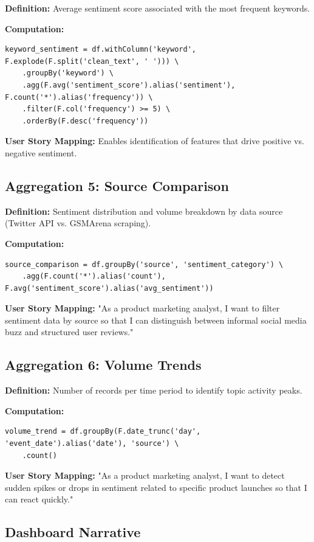 \documentclass[12pt]{article}
\begin{document}
\textbf{Definition:} Average sentiment score associated with the most frequent keywords.

\textbf{Computation:}
\begin{lstlisting}
keyword_sentiment = df.withColumn('keyword', F.explode(F.split('clean_text', ' '))) \
    .groupBy('keyword') \
    .agg(F.avg('sentiment_score').alias('sentiment'), F.count('*').alias('frequency')) \
    .filter(F.col('frequency') >= 5) \
    .orderBy(F.desc('frequency'))
\end{lstlisting}

\textbf{User Story Mapping:} Enables identification of features that drive positive vs. negative sentiment.

\subsection{Aggregation 5: Source Comparison}

\textbf{Definition:} Sentiment distribution and volume breakdown by data source (Twitter API vs. GSMArena scraping).

\textbf{Computation:}
\begin{lstlisting}
source_comparison = df.groupBy('source', 'sentiment_category') \
    .agg(F.count('*').alias('count'), F.avg('sentiment_score').alias('avg_sentiment'))
\end{lstlisting}

\textbf{User Story Mapping:} "As a product marketing analyst, I want to filter sentiment data by source so that I can distinguish between informal social media buzz and structured user reviews."

\subsection{Aggregation 6: Volume Trends}

\textbf{Definition:} Number of records per time period to identify topic activity peaks.

\textbf{Computation:}
\begin{lstlisting}
volume_trend = df.groupBy(F.date_trunc('day', 'event_date').alias('date'), 'source') \
    .count()
\end{lstlisting}

\textbf{User Story Mapping:} "As a product marketing analyst, I want to detect sudden spikes or drops in sentiment related to specific product launches so that I can react quickly."

\subsection{Dashboard Narrative}
\end{document}
